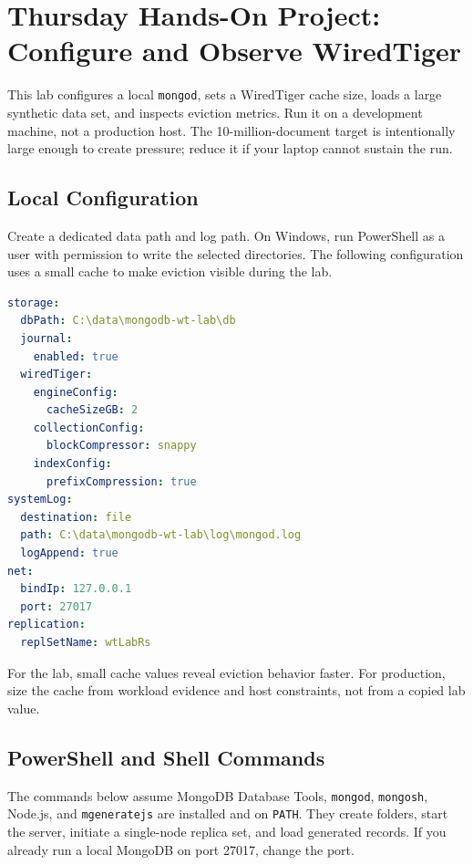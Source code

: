 \section{Thursday Hands-On Project: Configure and Observe WiredTiger}
This lab configures a local \texttt{mongod}, sets a WiredTiger cache size, loads a large synthetic data set, and inspects eviction metrics. Run it on a development machine, not a production host. The 10-million-document target is intentionally large enough to create pressure; reduce it if your laptop cannot sustain the run.

\subsection{Local Configuration}
Create a dedicated data path and log path. On Windows, run PowerShell as a user with permission to write the selected directories. The following configuration uses a small cache to make eviction visible during the lab.

\begin{lstlisting}[language=yaml, caption={Development-only \texttt{mongod.conf} with an explicit WiredTiger cache size.}]
storage:
  dbPath: C:\data\mongodb-wt-lab\db
  journal:
    enabled: true
  wiredTiger:
    engineConfig:
      cacheSizeGB: 2
    collectionConfig:
      blockCompressor: snappy
    indexConfig:
      prefixCompression: true
systemLog:
  destination: file
  path: C:\data\mongodb-wt-lab\log\mongod.log
  logAppend: true
net:
  bindIp: 127.0.0.1
  port: 27017
replication:
  replSetName: wtLabRs
\end{lstlisting}

\begin{tipbox}
For the lab, small cache values reveal eviction behavior faster. For production, size the cache from workload evidence and host constraints, not from a copied lab value.
\end{tipbox}

\subsection{PowerShell and Shell Commands}
The commands below assume MongoDB Database Tools, \texttt{mongod}, \texttt{mongosh}, Node.js, and \texttt{mgeneratejs} are installed and on \texttt{PATH}. They create folders, start the server, initiate a single-node replica set, and load generated records. If you already run a local MongoDB on port 27017, change the port.

